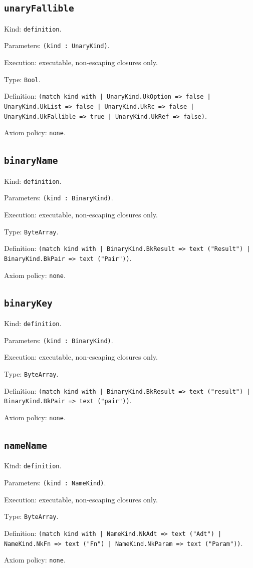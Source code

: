 \documentclass[11pt]{article}
\begin{document}
\subsection*{\texttt{unaryFallible}}
\noindent Kind: \texttt{definition}.\par
\noindent Parameters: \texttt{(kind : UnaryKind)}.\par
\noindent Execution: executable, non-escaping closures only.\par
\noindent Type: \texttt{Bool}.\par
\noindent Definition: \texttt{(match kind with | UnaryKind.UkOption => false | UnaryKind.UkList => false | UnaryKind.UkRc => false | UnaryKind.UkFallible => true | UnaryKind.UkRef => false)}.\par
\noindent Axiom policy: \texttt{none}.\par
\subsection*{\texttt{binaryName}}
\noindent Kind: \texttt{definition}.\par
\noindent Parameters: \texttt{(kind : BinaryKind)}.\par
\noindent Execution: executable, non-escaping closures only.\par
\noindent Type: \texttt{ByteArray}.\par
\noindent Definition: \texttt{(match kind with | BinaryKind.BkResult => text ("Result") | BinaryKind.BkPair => text ("Pair"))}.\par
\noindent Axiom policy: \texttt{none}.\par
\subsection*{\texttt{binaryKey}}
\noindent Kind: \texttt{definition}.\par
\noindent Parameters: \texttt{(kind : BinaryKind)}.\par
\noindent Execution: executable, non-escaping closures only.\par
\noindent Type: \texttt{ByteArray}.\par
\noindent Definition: \texttt{(match kind with | BinaryKind.BkResult => text ("result") | BinaryKind.BkPair => text ("pair"))}.\par
\noindent Axiom policy: \texttt{none}.\par
\subsection*{\texttt{nameName}}
\noindent Kind: \texttt{definition}.\par
\noindent Parameters: \texttt{(kind : NameKind)}.\par
\noindent Execution: executable, non-escaping closures only.\par
\noindent Type: \texttt{ByteArray}.\par
\noindent Definition: \texttt{(match kind with | NameKind.NkAdt => text ("Adt") | NameKind.NkFn => text ("Fn") | NameKind.NkParam => text ("Param"))}.\par
\noindent Axiom policy: \texttt{none}.\par
\end{document}
